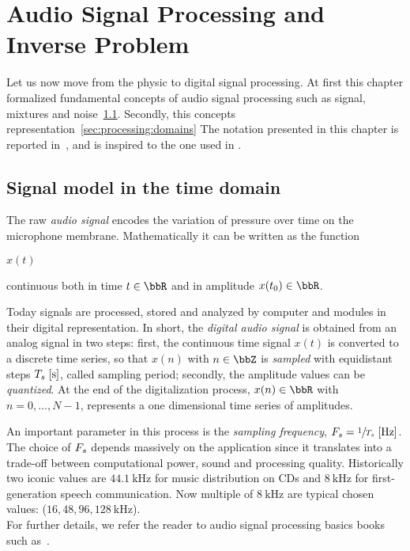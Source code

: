 \chapter{Audio Signal Processing and Inverse Problem}\label{ch:processing}
\vspace{-2.5em}
 Let us now move from the physic to digital signal processing.
At first this chapter formalized fundamental concepts of audio signal processing such as signal, mixtures and noise~\cref{sec:processing:model}.
Secondly, this concepts representation~\cref{sec:processing:domains}
The notation presented in this chapter is reported in~, and is inspired to the one used in .

\section{Signal model in the time domain}\label{sec:processing:model}
The raw \textit{audio signal} encodes the variation of pressure over time on the microphone membrane.
Mathematically it can be written as the function
\begin{center}
    $x(t)$
\end{center}
continuous both in time $t \in \R$ and in amplitude $x(t_0) \in \R$.

Today signals are processed, stored and analyzed by computer and modules in their digital representation.
In short, the \textit{digital audio signal} is obtained from an analog signal in two steps:
first, the continuous time signal $x(t)$ is converted to a discrete time series,
so that $x(n)$ with $n \in \Z$ is \textit{sampled}  with equidistant steps $T_s\;[\si{\second}]$, called sampling period;
secondly, the amplitude values can be \textit{quantized}.
At the end of the digitalization process, $x(n) \in \R$ with $n = 0, \dots, N-1$, represents a one dimensional time series of amplitudes.

An important parameter in this process is the \textit{sampling frequency},  $\Fs = \sfrac{1}{\Ts}\;[\si{\Hz}]$.
The choice of $F_s$ depends massively on the application since it translates into a trade-off between computational power, sound and processing quality.
Historically two iconic values are $\SI{44.1}{\kHz}$ for music distribution on CDs and $\SI{8}{\kHz}$ for first-generation speech communication.
Now multiple of $\SI{8}{\kHz}$ are typical chosen values: ($16, 48, 96, \SI{128}{\kHz}$).
\\For further details, we refer the reader to audio signal processing basics books such as~\cite{rocchesso2003introduction}.

